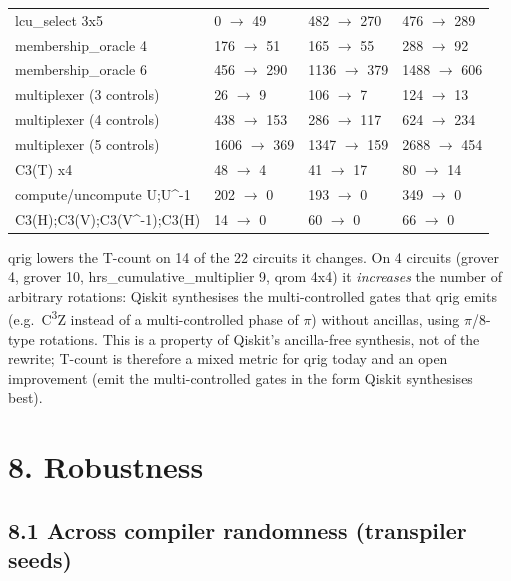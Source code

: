 \documentclass[
  10pt,
]{article}
\begin{document}
{\begin{longtable}[]{@{}llll@{}}
lcu\_select 3x5 & 0 \ensuremath{\rightarrow} 49 & 482 \ensuremath{\rightarrow} 270 & 476 \ensuremath{\rightarrow} 289 \\
membership\_oracle 4 & 176 \ensuremath{\rightarrow} 51 & 165 \ensuremath{\rightarrow} 55 & 288 \ensuremath{\rightarrow} 92 \\
membership\_oracle 6 & 456 \ensuremath{\rightarrow} 290 & 1136 \ensuremath{\rightarrow} 379 & 1488 \ensuremath{\rightarrow} 606 \\
multiplexer (3 controls) & 26 \ensuremath{\rightarrow} 9 & 106 \ensuremath{\rightarrow} 7 & 124 \ensuremath{\rightarrow} 13 \\
multiplexer (4 controls) & 438 \ensuremath{\rightarrow} 153 & 286 \ensuremath{\rightarrow} 117 & 624 \ensuremath{\rightarrow} 234 \\
multiplexer (5 controls) & 1606 \ensuremath{\rightarrow} 369 & 1347 \ensuremath{\rightarrow} 159 & 2688 \ensuremath{\rightarrow} 454 \\
C3(T) x4 & 48 \ensuremath{\rightarrow} 4 & 41 \ensuremath{\rightarrow} 17 & 80 \ensuremath{\rightarrow} 14 \\
compute/uncompute U;U\^{}-1 & 202 \ensuremath{\rightarrow} 0 & 193 \ensuremath{\rightarrow} 0 & 349 \ensuremath{\rightarrow} 0 \\
C3(H);C3(V);C3(V\^{}-1);C3(H) & 14 \ensuremath{\rightarrow} 0 & 60 \ensuremath{\rightarrow} 0 & 66 \ensuremath{\rightarrow} 0 \\
\end{longtable}
}

qrig lowers the T-count on 14 of the 22 circuits it changes. On 4
circuits (grover 4, grover 10, hrs\_cumulative\_multiplier 9, qrom 4x4)
it \emph{increases} the number of arbitrary rotations: Qiskit
synthesises the multi-controlled gates that qrig emits (e.g.~C\textsuperscript{3}Z instead
of a multi-controlled phase of \ensuremath{\pi}) without ancillas, using \ensuremath{\pi}/8-type
rotations. This is a property of Qiskit's ancilla-free synthesis, not of
the rewrite; T-count is therefore a mixed metric for qrig today and an
open improvement (emit the multi-controlled gates in the form Qiskit
synthesises best).

\section{8. Robustness}\label{robustness}

\subsection{8.1 Across compiler randomness (transpiler
seeds)}\label{across-compiler-randomness-transpiler-seeds}
\end{document}

